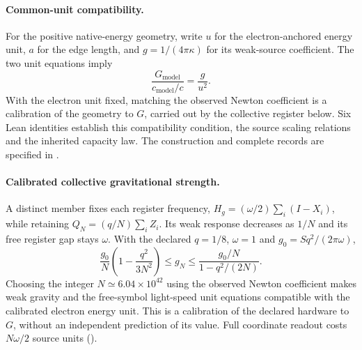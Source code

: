 \paragraph{Common-unit compatibility.}
For the positive native-energy geometry, write $u$ for the electron-anchored
energy unit, $a$ for the edge length, and $g=1/(4\pi\kappa)$ for its weak-source
coefficient. The two unit equations imply
\[
 \frac{G_{\mathrm{model}}}{c_{\mathrm{model}}/c}=\frac{g}{u^2}.
\]
With the electron unit fixed, matching the observed Newton coefficient is
a calibration of the geometry to $G$, carried out by the collective
register below. Six Lean identities establish
this compatibility condition, the source scaling relations and the inherited
capacity law.
The construction and complete records are specified in .

\paragraph{Calibrated collective gravitational strength.}
A distinct member fixes each register frequency,
$H_g=(\omega/2)\sum_i(I-X_i)$, while retaining
$Q_N=(q/N)\sum_iZ_i$. Its weak response decreases as $1/N$ and its
free register gap stays $\omega$. With the declared $q=1/8$, $\omega=1$ and
$g_0=S q^2/(2\pi\omega)$,
\[
 \frac{g_0}{N}\left(1-\frac{q^2}{3N^2}\right)
 \le g_N\le\frac{g_0/N}{1-q^2/(2N)}.
\]
Choosing the integer $N\simeq6.04\times10^{42}$ using the observed
Newton coefficient makes weak gravity and the free-symbol light-speed
unit equations compatible with the calibrated electron energy unit. This
is a calibration of the declared hardware to $G$, without an independent
prediction of its value. Full coordinate readout costs $N\omega/2$
source units ().
